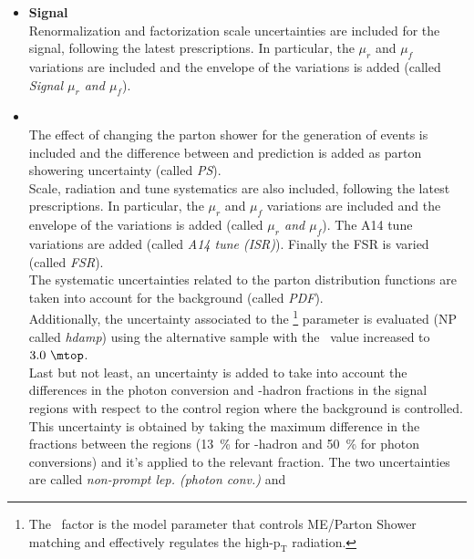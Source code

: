 \begin{itemize}	
	\item \textbf{Signal} \\ 
	Renormalization and factorization scale uncertainties are included for the signal, following the
	latest prescriptions. In particular, the $\mu_r$ and $\mu_f$
	variations are included and the envelope of the variations is added 
	(called \textit{Signal $\mu_r$ and $\mu_f$}). \\
	\item \textbf{\ttbar} \\
	The effect of changing the parton shower for the generation of \ttbar events is
	included and the difference between \PythiaEight and 
	prediction is added as \ttbar parton showering uncertainty (called
	\textit{\ttbar PS}). \\
	Scale, radiation and tune systematics are also included, following the
	latest prescriptions. In particular, the $\mu_r$ and $\mu_f$
	variations are included and the envelope of the variations is added 
	(called \textit{\ttbar $\mu_r$ and $\mu_f$}). The A14 tune
	variations are added (called \textit{\ttbar A14 tune (ISR)}). Finally the FSR is varied (called \textit{\ttbar FSR}). \\  
	The systematic uncertainties related to the parton distribution
	functions are taken into account for the \ttbar background (called
	\textit{\ttbar PDF}). \\
	Additionally, the uncertainty associated to the \hdamp\footnote{The \hdamp\ factor is the model parameter that controls ME/Parton Shower matching and effectively regulates the high-$\mathrm{p_{T}}$ radiation.} parameter is evaluated (NP called \textit{\ttbar hdamp})
	using the alternative sample with the \hdamp\ value increased to $3.0~\mtop$.\\
	Last but not least, an uncertainty is added to take into account the differences in the
	photon conversion and \Pqb-hadron fractions in the signal regions with
	respect to the \ttbar control region where the \ttbar background is
	controlled. 
	This uncertainty is obtained by taking the maximum
	difference in the fractions between the regions (\SI{13}{\%} for
	\Pqb-hadron and \SI{50}{\%} for photon conversions) and it's applied
	to the relevant fraction. 
	The two uncertainties are called
	\textit{\ttbar non-prompt lep. (photon conv.)} and 

\end{itemize}
